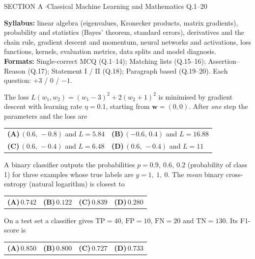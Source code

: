 \documentclass[11pt,a4paper]{article}
\newcommand{\optlabel}[1]{\textbf{(#1)}}
\newenvironment{qitem}[1]{\begin{list}{}{\setlength{\leftmargin}{3.3em}\setlength{\labelwidth}{3.1em}%
  \setlength{\labelsep}{0.2em}\setlength{\topsep}{3pt}\setlength{\parsep}{3pt}}\item[\textbf{Q.#1}\hfill]}{\end{list}}
\newcommand{\qsep}{\par\vspace{2pt}{\color{black!15}\hrule}\vspace{4pt}}
\begin{document}
\begin{sectionbanner}SECTION A \enspace$\cdot$\enspace Classical Machine Learning and Mathematics \hfill Q.1--20\end{sectionbanner}

{\small \textbf{Syllabus:} linear algebra (eigenvalues, Kronecker products, matrix gradients), probability and statistics (Bayes' theorem, standard errors), derivatives and the chain rule, gradient descent and momentum, neural networks and activations, loss functions, kernels, evaluation metrics, data splits and model diagnosis.\\ \textbf{Formats:} Single-correct MCQ (Q.1--14); Matching lists (Q.15--16); Assertion--Reason (Q.17); Statement I / II (Q.18); Paragraph based (Q.19--20). Each question: $+3$ / $0$ / $-1$.}
\par\medskip

\begin{qitem}{1}
The loss $L(w_1, w_2) = (w_1 - 3)^2 + 2(w_2 + 1)^2$ is minimised by gradient descent with learning rate
$\eta = 0.1$, starting from $\mathbf w = (0, 0)$. After \emph{one} step the parameters and the loss are
\par\smallskip\noindent\begin{tabularx}{\linewidth}{@{}*{2}{L}@{}}
\optlabel{A}\,$(0.6,\,-0.8)$ and $L = 5.84$ & \optlabel{B}\,$(-0.6,\,0.4)$ and $L = 16.88$ \\[3pt]
\optlabel{C}\,$(0.6,\,-0.4)$ and $L = 6.48$ & \optlabel{D}\,$(0.6,\,-0.4)$ and $L = 11$
\end{tabularx}
\end{qitem}
\qsep

\begin{qitem}{2}
A binary classifier outputs the probabilities $p = 0.9,\ 0.6,\ 0.2$ (probability of class 1) for three
examples whose true labels are $y = 1,\ 1,\ 0$. The \emph{mean} binary cross-entropy (natural logarithm) is closest to
\par\smallskip\noindent\begin{tabularx}{\linewidth}{@{}*{4}{L}@{}}
\optlabel{A}\,$0.742$ & \optlabel{B}\,$0.122$ & \optlabel{C}\,$0.839$ & \optlabel{D}\,$0.280$
\end{tabularx}
\end{qitem}
\qsep

\begin{qitem}{3}
On a test set a classifier gives $\text{TP} = 40$, $\text{FP} = 10$, $\text{FN} = 20$ and $\text{TN} = 130$. Its F1-score is
\par\smallskip\noindent\begin{tabularx}{\linewidth}{@{}*{4}{L}@{}}
\optlabel{A}\,$0.850$ & \optlabel{B}\,$0.800$ & \optlabel{C}\,$0.727$ & \optlabel{D}\,$0.733$
\end{tabularx}
\end{qitem}
\qsep
\end{document}
